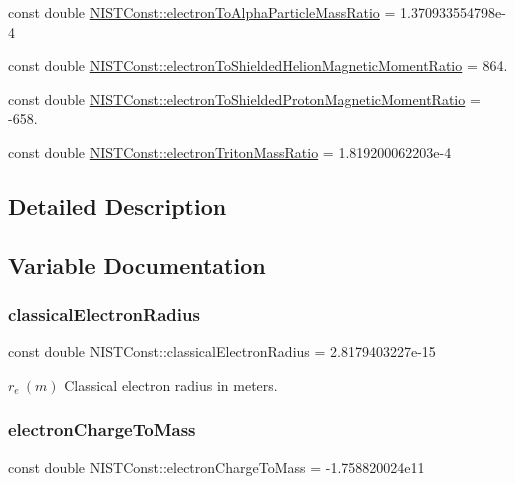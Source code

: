 \begin{DoxyCompactItemize}
const double \hyperlink{group___electron_ga1090a3f764cafde391a3dfe7f459a94d}{N\+I\+S\+T\+Const\+::electron\+To\+Alpha\+Particle\+Mass\+Ratio} = 1.\+370933554798e-\/4
\item 
const double \hyperlink{group___electron_gaff98723ab3ee4e1be57a04f2a0f6034d}{N\+I\+S\+T\+Const\+::electron\+To\+Shielded\+Helion\+Magnetic\+Moment\+Ratio} = 864.
\item 
const double \hyperlink{group___electron_gacf35e7562c94178f6b182cff46131b6d}{N\+I\+S\+T\+Const\+::electron\+To\+Shielded\+Proton\+Magnetic\+Moment\+Ratio} = -\/658.
\item 
const double \hyperlink{group___electron_gac9bfee1055b6fd5d3dabb3126318b52e}{N\+I\+S\+T\+Const\+::electron\+Triton\+Mass\+Ratio} = 1.\+819200062203e-\/4
\end{DoxyCompactItemize}


\subsection{Detailed Description}


\subsection{Variable Documentation}
\mbox{\label{group___electron_gac67d6a01d8d75cb66290a36f7123942b}} 
\subsubsection{\texorpdfstring{classical\+Electron\+Radius}{classicalElectronRadius}}
{\footnotesize\ttfamily const double N\+I\+S\+T\+Const\+::classical\+Electron\+Radius = 2.\+8179403227e-\/15}

$r_e \ (m)$ Classical electron radius in meters. \mbox{\label{group___electron_ga941e6299b6ef4b90cc525c335d9989dc}} 
\subsubsection{\texorpdfstring{electron\+Charge\+To\+Mass}{electronChargeToMass}}
{\footnotesize\ttfamily const double N\+I\+S\+T\+Const\+::electron\+Charge\+To\+Mass = -\/1.\+758820024e11}

